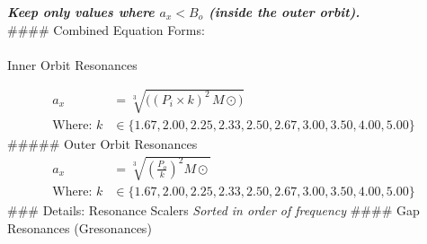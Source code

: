 \documentclass[
  letterpaper,
]{book}
\makeatletter
\let\oldparagraph\paragraph
\renewcommand{\paragraph}{
    \@ifstar
      \xxxParagraphStar
      \xxxParagraphNoStar
  }
\newcommand{\xxxParagraphStar}[1]{\oldparagraph*{#1}\mbox{}}
\newcommand{\xxxParagraphNoStar}[1]{\oldparagraph{#1}\mbox{}}
\makeatother
\begin{document}
\textbf{\emph{Keep only values where \(a_x < B_o\) (inside the outer
orbit).}}\\
\#\#\#\# Combined Equation Forms:

\paragraph{Inner Orbit Resonances}\label{inner-orbit-resonances}

\[
\begin{align}
a_x &= \sqrt[3]{\Big((P_i \times k)^2 \, M\odot\Big)} \\[0.5em]
 \text{Where: } k &\in \{1.67, 2.00, 2.25, 2.33, 2.50, 2.67, 3.00, 3.50, 4.00, 5.00\}
\end{align}
\] \#\#\#\#\# Outer Orbit Resonances \[
\begin{align}
a_x &= \sqrt[3]{\left(\frac{P_o}{k}\right)^2 M\odot} \\[0.5em]
 \text{Where: } k &\in \{1.67, 2.00, 2.25, 2.33, 2.50, 2.67, 3.00, 3.50, 4.00, 5.00\}
 \end{align}
\] \#\#\# Details: Resonance Scalers \emph{Sorted in order of frequency}
\#\#\#\# Gap Resonances (Gresonances)
\end{document}
